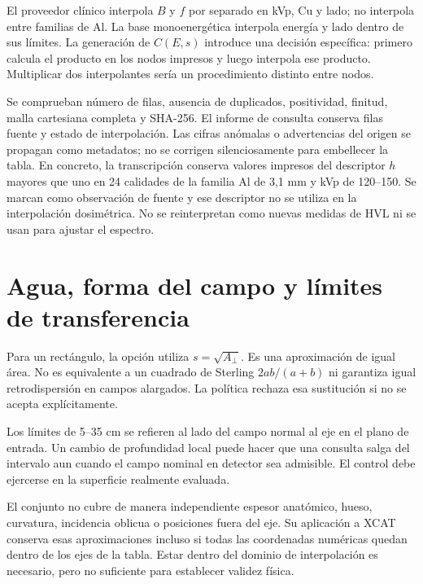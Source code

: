 El proveedor clínico interpola $B$ y $f$ por separado en kVp, Cu y lado; no interpola entre familias de Al. La base monoenergética interpola energía y lado dentro de sus límites. La generación de $C(E,s)$ introduce una decisión específica: primero calcula el producto en los nodos impresos y luego interpola ese producto. Multiplicar dos interpolantes sería un procedimiento distinto entre nodos.

Se comprueban número de filas, ausencia de duplicados, positividad, finitud, malla cartesiana completa y SHA-256. El informe de consulta conserva filas fuente y estado de interpolación. Las cifras anómalas o advertencias del origen se propagan como metadatos; no se corrigen silenciosamente para embellecer la tabla. En concreto, la transcripción conserva valores impresos del descriptor $h$ mayores que uno en 24 calidades de la familia Al de 3,1 mm y kVp de 120--150. Se marcan como observación de fuente y ese descriptor no se utiliza en la interpolación dosimétrica. No se reinterpretan como nuevas medidas de HVL ni se usan para ajustar el espectro.

\section{Agua, forma del campo y límites de transferencia}
Para un rectángulo, la opción  utiliza $s=\sqrt{A_\perp}$. Es una aproximación de igual área. No es equivalente a un cuadrado de Sterling $2ab/(a+b)$ ni garantiza igual retrodispersión en campos alargados. La política  rechaza esa sustitución si no se acepta explícitamente.

Los límites de 5--35 cm se refieren al lado del campo normal al eje en el plano de entrada. Un cambio de profundidad local puede hacer que una consulta salga del intervalo aun cuando el campo nominal en detector sea admisible. El control debe ejercerse en la superficie realmente evaluada.

El conjunto no cubre de manera independiente espesor anatómico, hueso, curvatura, incidencia oblicua o posiciones fuera del eje. Su aplicación a XCAT conserva esas aproximaciones incluso si todas las coordenadas numéricas quedan dentro de los ejes de la tabla. Estar dentro del dominio de interpolación es necesario, pero no suficiente para establecer validez física.
\FloatBarrier
